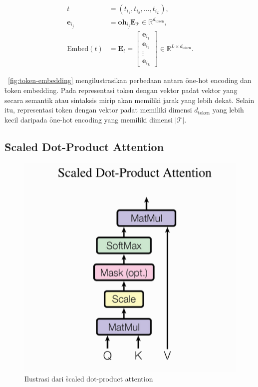 	
	\begin{align}
		\label{equ:token-embedding-start}
		t &= (t_{i_1}, t_{i_2}, \dots, t_{i_L}), \\
		\mathbf{e}_{i_j} &= \mathbf{oh}_{i_j} \mathbf{E}_{\mathcal{T}} \in \mathbb{R}^{d_{\text{token}}}, \\
		\label{equ:token-embedding-end}
		\text{Embed}(t) &= \mathbf{E}_{t} = \begin{bmatrix}
			\mathbf{e}_{i_1} \\
			\mathbf{e}_{i_2} \\
			\vdots \\
			\mathbf{e}_{i_L}
		\end{bmatrix} \in \mathbb{R}^{L \times d_{\text{token}}}.
	\end{align}
	
	\pic~\ref{fig:token-embedding} mengilustrasikan perbedaan antara \f{one-hot encoding} dan \f{token embedding}. Pada representasi token dengan vektor padat vektor yang secara semantik atau sintaksis mirip akan memiliki jarak yang lebih dekat. Selain itu, representasi token dengan vektor padat memiliki dimensi $d_{\text{token}}$ yang lebih kecil daripada \f{one-hot encoding} yang memiliki dimensi $|\mathcal{T}|$.

	\subsection{\f{Scaled Dot-Product Attention}}
	\label{sec:scaled-dot-product-attention}

	\begin{figure}
		\centering
		\includegraphics[width=1\textwidth]{assets/pics/scaleddotattention.png}
		\caption{Ilustrasi dari \f{scaled dot-product attention} \citep{transformerori}}
		\label{fig:scaled-dot-product-attention}
	\end{figure}

